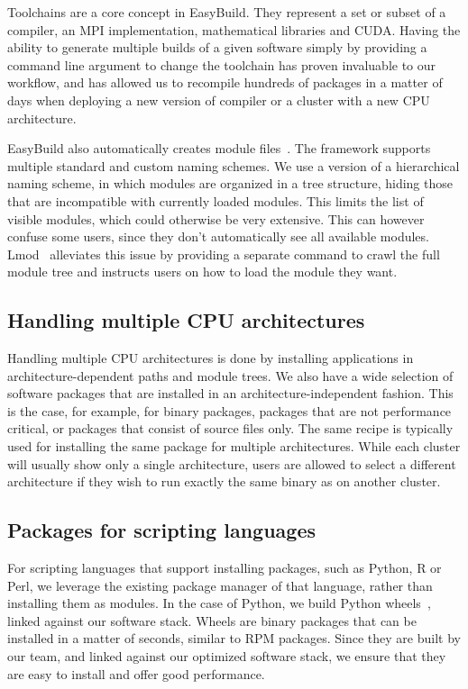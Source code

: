 \documentclass[sigconf]{acmart}
\begin{document}
Toolchains are a core concept in EasyBuild. They represent a set or subset of a compiler, an MPI implementation, mathematical libraries and CUDA. Having the ability to generate multiple builds of a given software simply by providing a command line argument to change the toolchain has proven invaluable to our workflow, and has allowed us to recompile hundreds of packages in a matter of days when deploying a new version of compiler or a cluster with a new CPU architecture. 

EasyBuild also automatically creates module files~\cite{Modules1991,Modules1996,Lmod}. The framework supports multiple standard and custom naming schemes. We use a version of a hierarchical naming scheme, in which modules are organized in a tree structure, hiding those that are incompatible with currently loaded modules. This limits the list of visible modules, which could otherwise be very extensive. This can however confuse some users, since they don’t automatically see all available modules. Lmod~\cite{Lmod} alleviates this issue by providing a separate command to crawl the full module tree and instructs users on how to load the module they want.

\subsection{Handling multiple CPU architectures}
\label{sub:Handling_multiple_CPU_architectures}
Handling multiple CPU architectures is done by installing applications in architecture-dependent paths and module trees. We also have a wide selection of software packages that are installed in an architecture-independent fashion. This is the case, for example, for binary packages, packages that are not performance critical, or packages that consist of source files only. The same recipe is typically used for installing the same package for multiple architectures. While each cluster will usually show only a single architecture, users are allowed to select a different architecture if they wish to run exactly the same binary as on another cluster.

\subsection{Packages for scripting languages}
\label{sub:Packages_for_scripting_languages}
For scripting languages that support installing packages, such as Python, R or Perl, we leverage the existing package manager of that language, rather than installing them as modules. In the case of Python, we build Python wheels~\cite{Wheels}, linked against our software stack. Wheels are binary packages that can be installed in a matter of seconds, similar to RPM packages. Since they are built by our team, and linked against our optimized software stack, we ensure that they are easy to install and offer good performance.
\end{document}
